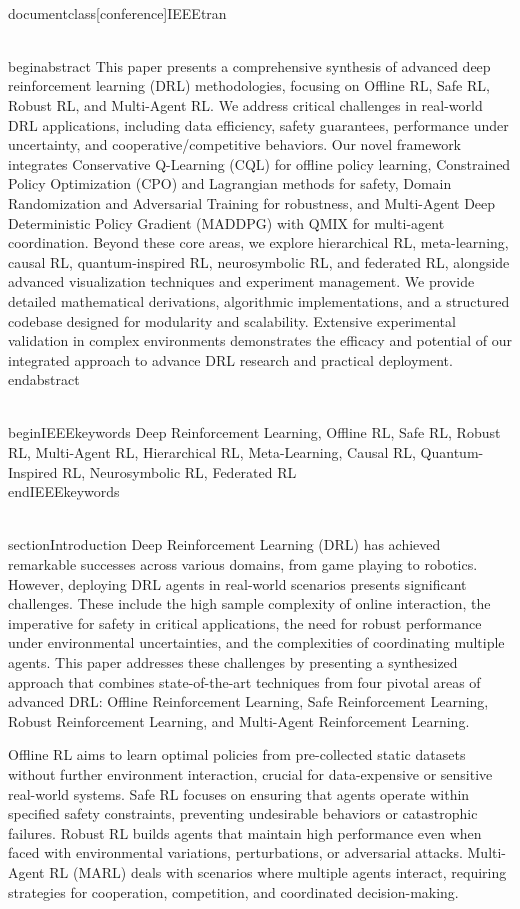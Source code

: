 \\documentclass[conference]{IEEEtran}
\begin{document}
\\begin{abstract}
This paper presents a comprehensive synthesis of advanced deep reinforcement learning (DRL) methodologies, focusing on Offline RL, Safe RL, Robust RL, and Multi-Agent RL. We address critical challenges in real-world DRL applications, including data efficiency, safety guarantees, performance under uncertainty, and cooperative/competitive behaviors. Our novel framework integrates Conservative Q-Learning (CQL) for offline policy learning, Constrained Policy Optimization (CPO) and Lagrangian methods for safety, Domain Randomization and Adversarial Training for robustness, and Multi-Agent Deep Deterministic Policy Gradient (MADDPG) with QMIX for multi-agent coordination. Beyond these core areas, we explore hierarchical RL, meta-learning, causal RL, quantum-inspired RL, neurosymbolic RL, and federated RL, alongside advanced visualization techniques and experiment management. We provide detailed mathematical derivations, algorithmic implementations, and a structured codebase designed for modularity and scalability. Extensive experimental validation in complex environments demonstrates the efficacy and potential of our integrated approach to advance DRL research and practical deployment.
\\end{abstract}

\\begin{IEEEkeywords}
Deep Reinforcement Learning, Offline RL, Safe RL, Robust RL, Multi-Agent RL, Hierarchical RL, Meta-Learning, Causal RL, Quantum-Inspired RL, Neurosymbolic RL, Federated RL
\\end{IEEEkeywords}

\\section{Introduction}
Deep Reinforcement Learning (DRL) has achieved remarkable successes across various domains, from game playing to robotics. However, deploying DRL agents in real-world scenarios presents significant challenges. These include the high sample complexity of online interaction, the imperative for safety in critical applications, the need for robust performance under environmental uncertainties, and the complexities of coordinating multiple agents. This paper addresses these challenges by presenting a synthesized approach that combines state-of-the-art techniques from four pivotal areas of advanced DRL: Offline Reinforcement Learning, Safe Reinforcement Learning, Robust Reinforcement Learning, and Multi-Agent Reinforcement Learning.

Offline RL aims to learn optimal policies from pre-collected static datasets without further environment interaction, crucial for data-expensive or sensitive real-world systems. Safe RL focuses on ensuring that agents operate within specified safety constraints, preventing undesirable behaviors or catastrophic failures. Robust RL builds agents that maintain high performance even when faced with environmental variations, perturbations, or adversarial attacks. Multi-Agent RL (MARL) deals with scenarios where multiple agents interact, requiring strategies for cooperation, competition, and coordinated decision-making.
\end{document}
